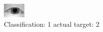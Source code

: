 \begin{figure}[h!]
\begin{center}
\includegraphics[width=0.60\columnwidth]{figures/ID1025_class_1_target_2.png}
\end{center}
\caption{ Classification: 1 actual target: 2}
\label{fig:ID1025_class_1_target_2}
\end{figure}
